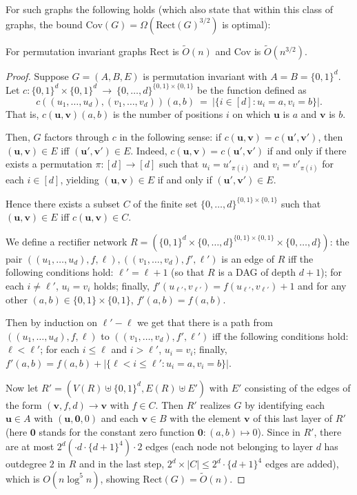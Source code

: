 \documentclass[submission]{llncs}
\def\Cov{{\mathrm{Cov}}}
\def\Rect{{\mathrm{Rect}}}
\def\bs#1{{\boldsymbol{#1}}}
\begin{document}
For such graphs the following holds (which also state that within this class of graphs, the bound $\Cov(G)=\Omega(\Rect(G)^{3/2})$ is optimal):
  \begin{theorem}
  \label{thm-perm}
For permutation invariant graphs $\Rect$ is $\tilde{O}(n)$ and $\Cov$ is $\tilde{O}(n^{3/2})$.
  \end{theorem}
  \begin{proof}
  Suppose $G=(A,B,E)$ is permutation invariant with $A=B=\{0,1\}^d$. Let $c:\{0,1\}^d\times\{0,1\}^d\ \to\ \{0,\ldots, d\}^{\{0,1\}\times\{0,1\}}$ be the function defined as
\[c((u_1,\ldots,u_d),(v_1,\ldots,v_d))(a,b)\ =\ |\{i\in[d]:u_i=a,v_i=b\}|.\]
That is,
  $c(\bs{u},\bs{v})(a,b)$ is the number of positions $i$ on which $\bs{u}$ is $a$ and $\bs{v}$ is $b$.

  Then, $G$ factors through $c$ in the following sense: if $c(\bs{u},\bs{v})=c(\bs{u}',\bs{v}')$, then $(\bs{u},\bs{v})\in E$ iff $(\bs{u}',\bs{v}')\in E$.
  Indeed, $c(\bs{u},\bs{v})=c(\bs{u}',\bs{v'})$ if and only if there exists a permutation $\pi:[d]\to[d]$ such that $u_i=u'_{\pi(i)}$ and
  $v_i=v'_{\pi(i)}$ for each $i\in [d]$, yielding $(\bs{u},\bs{v})\in E$ if and only if $(\bs{u}',\bs{v}')\in E$.

  Hence there exists a subset $C$ of the finite set $\{0,\ldots,d\}^{\{0,1\}\times\{0,1\}}$ such that $(\bs{u},\bs{v})\in E$ iff $c(\bs{u},\bs{v})\in C$.

We define a rectifier network $R=(\{0,1\}^d\times \{0,\ldots,d\}^{\{0,1\}\times\{0,1\}} \times\{0,\ldots,d\})$:
  the pair $((u_1,\ldots,u_d),f,\ell),((v_1,\ldots,v_d),f',\ell')$ is an edge of $R$ iff the following conditions hold:
$\ell'=\ell+1$ (so that $R$ is a DAG of depth $d+1$); for each $i\neq\ell'$, $u_i=v_i$ holds; finally,
  $f'(u_{\ell'},v_{\ell'})=f(u_{\ell'},v_{\ell'})+1$ and for any other $(a,b)\in\{0,1\}\times\{0,1\}$, $f'(a,b)=f(a,b)$.
  
  Then by induction on $\ell'-\ell$ we get that
  there is a path from $((u_1,\ldots,u_d),f,\ell)$ to
  $((v_1,\ldots,v_d),f',\ell')$ iff the following conditions hold:
$\ell < \ell'$; for each $i\leq\ell$ and $i>\ell'$, $u_i=v_i$; finally, $f'(a,b)=f(a,b)+|\{\ell<i\leq\ell':u_i=a,v_i=b\}|$.
  
  Now let $R'=(V(R)\uplus \{0,1\}^d,E(R)\uplus E')$ with $E'$ consisting of the edges of the form $(\bs{v},f,d)\to \bs{v}$ with $f\in C$.
  Then $R'$ realizes $G$ by identifying each $\bs{u}\in A$ with $(\bs{u},\bs{0},0)$ and each $\bs{v}\in B$ with the element $\bs{v}$ of this
  last layer of $R'$ (here $\bs{0}$ stands for the constant zero function $\bs{0}:(a,b)\mapsto 0$).
  Since in $R'$, there are at most $2^d(\cdot d\cdot\{d+1\}^4)\cdot 2$ edges (each node not belonging to layer $d$
  has outdegree $2$ in $R$ and in the last step, $2^d\times |C|\leq 2^d\cdot \{d+1\}^4$ edges are added), which is
  $O(n\log^5n)$, showing $\Rect(G)=\tilde{O}(n)$.


\end{proof}
\end{document}

